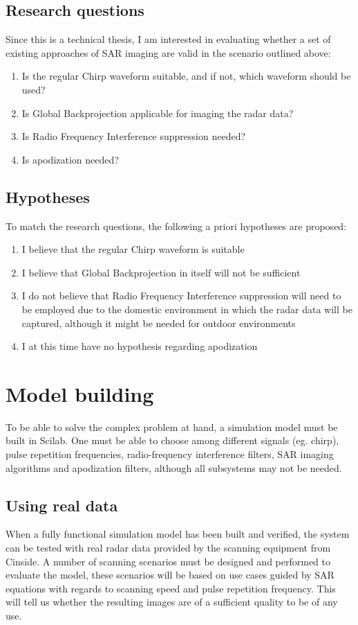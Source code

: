 \documentclass{chi2012}
\begin{document}
\subsection{Research questions}
Since this is a technical thesis, I am interested in evaluating whether a set of existing approaches of SAR imaging are valid in the scenario outlined above:
\begin{enumerate}
  \item Is the regular Chirp waveform suitable, and if not, which waveform should be used?
  \item Is Global Backprojection applicable for imaging the radar data?
  \item Is Radio Frequency Interference suppression needed?
  \item Is apodization needed?
\end{enumerate}

\subsection{Hypotheses}
To match the research questions, the following a priori hypotheses are proposed:
\begin{enumerate}
  \item I believe that the regular Chirp waveform is suitable
  \item I believe that Global Backprojection in itself will not be sufficient
  \item I do not believe that Radio Frequency Interference suppression will need to be employed due to the domestic environment in which the radar data will be captured, although it might be needed for outdoor environments
  \item I at this time have no hypothesis regarding apodization
\end{enumerate}

\section{Model building}
To be able to solve the complex problem at hand, a simulation model must be built in Scilab. One must be able to choose among different signals (eg. chirp), pulse repetition frequencies, radio-frequency interference filters, SAR imaging algorithms and apodization filters, although all subsystems may not be needed.

\subsection{Using real data}
When a fully functional simulation model has been built and verified, the system can be tested with real radar data provided by the scanning equipment from Cinside. A number of scanning scenarios must be designed and performed to evaluate the model, these scenarios will be based on use cases guided by SAR equations with regards to scanning speed and pulse repetition frequency. This will tell us whether the resulting images are of a sufficient quality to be of any use.
\end{document}
